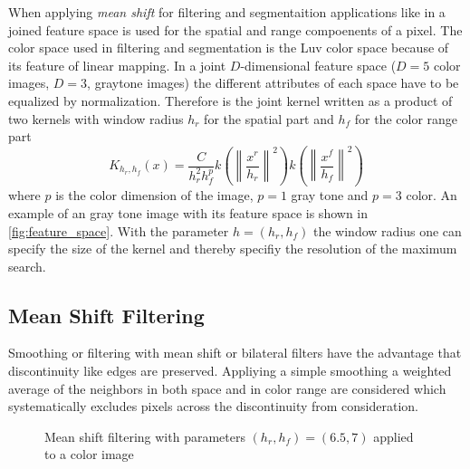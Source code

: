 When applying \emph{mean shift} for filtering and segmentaition applications
like in \citeauthor{citeulike:462300} \citep{citeulike:462300} a joined feature
space is used for the spatial and range compoenents of a pixel. The color space
used in filtering and segmentation is the \gls{Luv} color space because of its
feature of linear mapping. In a joint $D$-dimensional feature space ($D=5$ color
images, $D=3$, graytone images) the different attributes of each space have to be
equalized by normalization. Therefore is the joint kernel written as a product of
two kernels with window radius $h_r$ for the spatial part and $h_f$ for the 
color range part
\begin{equation}\label{eq:jokernel}
	K_{h_r, h_f}(x) = \frac{C}{h_r^2h_f^p}
	k \left( \left\lVert \frac{x^r}{h_r} \right\rVert^2\right) 
	k \left( \left\lVert \frac{x^f}{h_f} \right\rVert^2\right) 
\end{equation}
where $p$ is the color dimension of the image, $p=1$ gray tone and $p=3$ color. 
An example of an gray tone image with its feature space is shown in 
\autoref{fig:feature_space}. With the parameter $h = (h_r, h_f)$ the window
radius one can specify the size of the kernel and thereby specifiy the resolution
of the maximum search.

\subsection{Mean Shift Filtering} %
\label{sub:mean_shift_filtering}
Smoothing or filtering with mean shift or bilateral filters have the advantage
that discontinuity like edges are preserved. Appliying a simple smoothing a 
weighted average of the neighbors in both space and in color range are considered
which systematically excludes pixels across the discontinuity from consideration.

\begin{figure}[ht]
\centering
{}%
%
\caption{Mean shift filtering with parameters $(h_r, h_f) = (6.5, 7)$ applied to a color image}
\label{fig:filtsample}
\end{figure}

